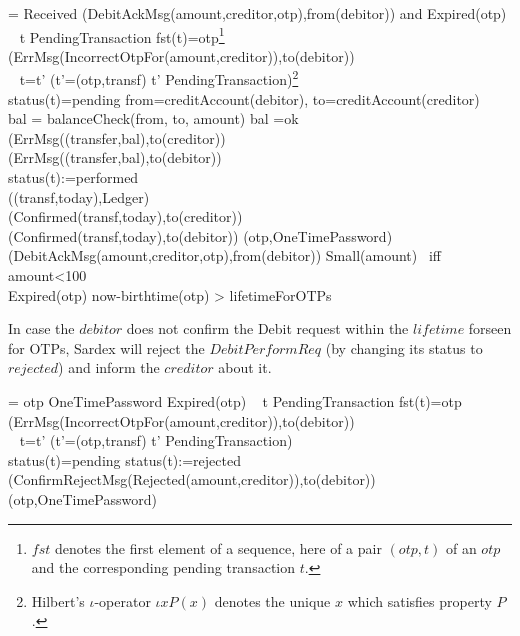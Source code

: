  \begin{asm}  
  =\+           
\IF Received
     (DebitAckMsg(amount,creditor,otp),from(debitor)) and \NOT Expired(otp) \THEN \+ 
  \IF ~ \THEREISNO t \in PendingTransaction \WITH fst(t)=otp\footnote{$fst$ denotes the first element of a sequence, here of a pair $(otp,t)$ of an $otp$ and the corresponding pending transaction $t$.} \+
     \THEN  ~ (ErrMsg(IncorrectOtpFor(amount,creditor)),to(debitor)) \\
  \ELSE ~\+
     \LET t=\iota t' (t'=(otp,transf) \mid t'  \in PendingTransaction)\footnote{Hilbert's $\iota$-operator $\iota x P(x)$ denotes the unique $x$ which satisfies property  $P$.}\\
     \IF status(t)=pending \THEN \+
        \LET from=creditAccount(debitor), to=creditAccount(creditor)\\
        \LET bal = balanceCheck(from, to, amount) \+
          \IF bal \not =ok \THEN \+
             (ErrMsg((transfer,bal),to(creditor))\\
             (ErrMsg((transfer,bal),to(debitor)) \\
              \ELSE \+
                status(t):=performed \\
                ((transf,today),Ledger) \\
                (Confirmed(transf,today),to(creditor))\\
                (Confirmed(transf,today),to(debitor))\dec\dec\-
                 (otp,OneTimePassword)\dec\dec\-  
  (DebitAckMsg(amount,creditor,otp),from(debitor)) \dec\-
\WHERE \+
Small(amount) \mbox{ iff } amount<100\\
Expired(otp) \IFF now-birthtime(otp) > lifetimeForOTPs
\end{asm}

In case the $debitor$ does not confirm the Debit request 
within the $lifetime$ forseen for OTPs,
Sardex will reject the $DebitPerformReq$ (by changing its status to $rejected$) and inform the $creditor$ about it.

\begin{asm}  
  =\+           
\IF otp \in OneTimePassword \AND Expired(otp)  \THEN \+ 
\IF ~ \THEREISNO t \in PendingTransaction \WITH fst(t)=otp\+
     \THEN  ~ (ErrMsg(IncorrectOtpFor(amount,creditor)),to(debitor)) \\
  \ELSE ~\+
     \LET t=\iota t' (t'=(otp,transf) \mid t'  \in PendingTransaction)\\
     \IF status(t)=pending \THEN \+
          status(t):=rejected\\
          (ConfirmRejectMsg(Rejected(amount,creditor)),to(debitor))
                          \dec\dec\-
     (otp,OneTimePassword)     
\end{asm}




